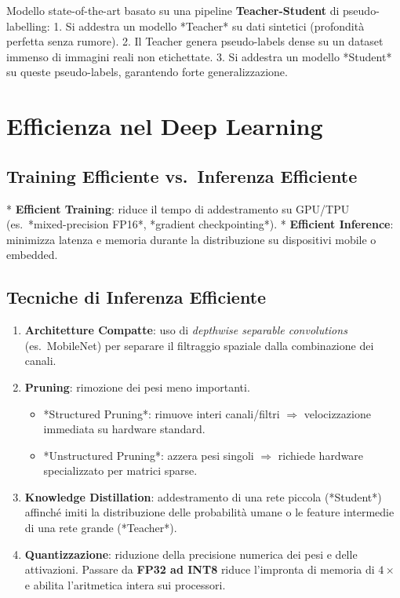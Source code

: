 \documentclass[12pt, a4paper]{report}
\begin{document}
Modello state-of-the-art basato su una pipeline \textbf{Teacher-Student} di pseudo-labelling:
1. Si addestra un modello *Teacher* su dati sintetici (profondità perfetta senza rumore).
2. Il Teacher genera pseudo-labels dense su un dataset immenso di immagini reali non etichettate.
3. Si addestra un modello *Student* su queste pseudo-labels, garantendo forte generalizzazione.

\chapter{Efficienza nel Deep Learning}

\section{Training Efficiente vs.\ Inferenza Efficiente}

*   \textbf{Efficient Training}: riduce il tempo di addestramento su GPU/TPU (es.\ *mixed-precision FP16*, *gradient checkpointing*).
*   \textbf{Efficient Inference}: minimizza latenza e memoria durante la distribuzione su
    dispositivi mobile o embedded.

\section{Tecniche di Inferenza Efficiente}

\begin{defbox}
\begin{enumerate}
  \item \textbf{Architetture Compatte}: uso di \emph{depthwise separable convolutions} (es.\ MobileNet)
        per separare il filtraggio spaziale dalla combinazione dei canali.
  \item \textbf{Pruning}: rimozione dei pesi meno importanti.
        \begin{itemize}
          \item *Structured Pruning*: rimuove interi canali/filtri $\Rightarrow$ velocizzazione immediata su hardware standard.
          \item *Unstructured Pruning*: azzera pesi singoli $\Rightarrow$ richiede hardware specializzato per matrici sparse.
        \end{itemize}
  \item \textbf{Knowledge Distillation}: addestramento di una rete piccola (*Student*) affinché
        imiti la distribuzione delle probabilità umane o le feature intermedie di una rete grande (*Teacher*).
  \item \textbf{Quantizzazione}: riduzione della precisione numerica dei pesi e delle attivazioni.
        Passare da \textbf{FP32 ad INT8} riduce l'impronta di memoria di $4\times$ e abilita
        l'aritmetica intera sui processori.
\end{enumerate}
\end{defbox}
\end{document}
